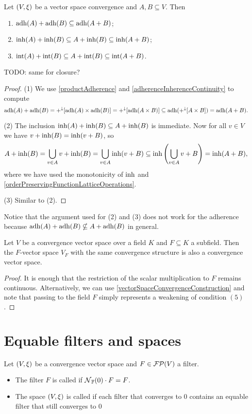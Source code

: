 \begin{proposition} \label{vectorSumInherenceAdherence}
Let $\sSet{V,\xi}$ be a vector space convergence and $A,B\subseteq V$. Then
\begin{enumerate}
\item $\operatorname{adh}(A)+\operatorname{adh}(B) \subseteq \operatorname{adh}(A+B)$;
\item $\operatorname{inh}(A)+\operatorname{inh}(B) \subseteq A+\operatorname{inh}(B) \subseteq \operatorname{inh}(A+B)$;
\item $\operatorname{int}(A)+\operatorname{int}(B) \subseteq A+\operatorname{int}(B) \subseteq \operatorname{int}(A+B)$.
\end{enumerate}
\end{proposition}
TODO: same for closure?
\begin{proof}
(1) We use \ref{productAdherence} and \ref{adherenceInherenceContinuity} to compute
\[ \operatorname{adh}(A)+\operatorname{adh}(B) = +^\downarrow[\operatorname{adh}(A)\times\operatorname{adh}(B)] = +^\downarrow[\operatorname{adh}(A\times B)] \subseteq \operatorname{adh}(+^\downarrow[A\times B]) = \operatorname{adh}(A+B). \]

(2) The inclusion $\operatorname{inh}(A)+\operatorname{inh}(B) \subseteq A+\operatorname{inh}(B)$ is immediate. Now for all $v\in V$ we have $v+\operatorname{inh}(B) = \operatorname{inh}(v+B)$, so
\[ A+\operatorname{inh}(B) = \bigcup_{v\in A}v+\operatorname{inh}(B) = \bigcup_{v\in A}\operatorname{inh}(v+B) \subseteq \operatorname{inh}\left(\bigcup_{v\in A} v+B\right) = \operatorname{inh}(A+B), \]
where we have used the monotonicity of $\operatorname{inh}$ and \ref{orderPreservingFunctionLatticeOperations}.

(3) Similar to (2).
\end{proof}
Notice that the argument used for (2) and (3) does not work for the adherence because $\operatorname{adh}(A)+\operatorname{adh}(B) \nsubseteq A+\operatorname{adh}(B)$ in general.

\begin{lemma}
Let $V$ be a convergence vector space over a field $K$ and $F\subseteq K$ a subfield. Then the $F$-vector space $V_F$ with the same convergence structure is also a convergence vector space.
\end{lemma}
\begin{proof}
It is enough that the restriction of the scalar multiplication to $F$ remains continuous. Alternatively, we can use \ref{vectorSpaceConvergenceConstruction} and note that passing to the field $F$ simply represents a weakening of condition $(5)$.
\end{proof}

\section{Equable filters and spaces}
\begin{definition}
Let $\sSet{V,\xi}$ be a convergence vector space and $F\in \operatorname{\mathcal{FP}}(V)$ a filter.
\begin{itemize}
\item The filter $F$ is called  if $\operatorname{\mathcal{N}}_{\mathbb{F}}(0)\cdot F = F$.
\item The space $\sSet{V, \xi}$ is called  if each filter that converges to $0$ contains an equable filter that still converges to $0$
\end{itemize}
\end{definition}

